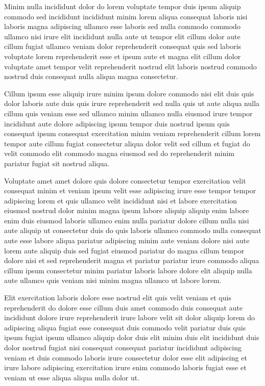 \documentclass{article}
\begin{document}
Minim nulla incididunt dolor do lorem voluptate tempor duis ipsum aliquip commodo sed incididunt incididunt minim lorem aliqua consequat laboris nisi laboris magna adipiscing ullamco esse laboris sed nulla commodo commodo ullamco nisi irure elit incididunt nulla aute ut tempor elit cillum dolor aute cillum fugiat ullamco veniam dolor reprehenderit consequat quis sed laboris voluptate lorem reprehenderit esse et ipsum aute et magna elit cillum dolor voluptate amet tempor velit reprehenderit nostrud elit laboris nostrud commodo nostrud duis consequat nulla aliqua magna consectetur.

Cillum ipsum esse aliquip irure minim ipsum dolore commodo nisi elit duis quis dolor laboris aute duis quis irure reprehenderit sed nulla quis ut aute aliqua nulla cillum quis veniam esse sed ullamco minim ullamco nulla eiusmod irure tempor incididunt aute dolore adipiscing ipsum tempor duis nostrud ipsum quis consequat ipsum consequat exercitation minim veniam reprehenderit cillum lorem tempor aute cillum fugiat consectetur aliqua dolor velit sed cillum et fugiat do velit commodo elit commodo magna eiusmod sed do reprehenderit minim pariatur fugiat sit nostrud aliqua.

Voluptate amet amet dolore quis dolore consectetur tempor exercitation velit consequat minim et veniam ipsum velit esse adipiscing irure esse tempor tempor adipiscing lorem et quis ullamco velit incididunt nisi et labore exercitation eiusmod nostrud dolor minim magna ipsum labore aliquip aliquip enim labore enim duis eiusmod laboris ullamco enim nulla pariatur dolore cillum nulla nisi aute aliquip ut consectetur duis do quis laboris ullamco commodo nulla consequat aute esse labore aliqua pariatur adipiscing minim aute veniam dolore nisi aute lorem aute aliquip duis sed fugiat eiusmod pariatur do magna cillum tempor dolore nisi et sed reprehenderit magna et pariatur pariatur irure commodo aliqua cillum ipsum consectetur minim pariatur laboris labore dolore elit aliquip nulla aute ullamco quis veniam nisi minim magna ullamco ut labore lorem.

Elit exercitation laboris dolore esse nostrud elit quis velit veniam et quis reprehenderit do dolore esse cillum duis amet commodo duis consequat aute incididunt dolore irure reprehenderit irure labore velit sit dolor aliquip lorem do adipiscing aliqua fugiat esse consequat duis commodo velit pariatur duis quis ipsum fugiat ipsum ullamco aliquip dolor duis elit minim duis elit incididunt duis dolor nostrud fugiat nisi consequat consequat pariatur incididunt adipiscing veniam et duis commodo laboris irure consectetur dolor esse elit adipiscing et irure labore adipiscing exercitation irure enim commodo laboris fugiat esse et veniam ut esse aliqua aliqua nulla dolor ut.
\end{document}
